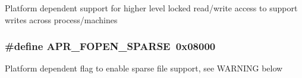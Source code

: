 Platform dependent support for higher level locked read/write access to support writes across process/machines \hypertarget{group__apr__file__open__flags_ga0d155e9bb7fbf1a5cd4e84b5ede059f4}{
\subsubsection[{A\-P\-R\-\_\-\-F\-O\-P\-E\-N\-\_\-\-S\-P\-A\-R\-S\-E}]{\setlength{\rightskip}{0pt plus 5cm}\#define A\-P\-R\-\_\-\-F\-O\-P\-E\-N\-\_\-\-S\-P\-A\-R\-S\-E~0x08000}}\label{group__apr__file__open__flags_ga0d155e9bb7fbf1a5cd4e84b5ede059f4}
Platform dependent flag to enable sparse file support, see W\-A\-R\-N\-I\-N\-G below


